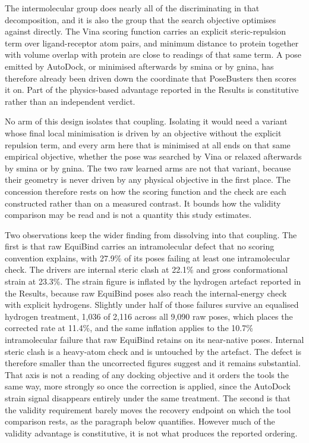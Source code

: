 The intermolecular group does nearly all of the discriminating in that decomposition, and it is also the group that the search objective optimises against directly. The Vina scoring function carries an explicit steric-repulsion term over ligand-receptor atom pairs, and minimum distance to protein together with volume overlap with protein are close to readings of that same term. A pose emitted by AutoDock, or minimised afterwards by smina or by gnina, has therefore already been driven down the coordinate that PoseBusters then scores it on. Part of the physics-based advantage reported in the Results is constitutive rather than an independent verdict.

No arm of this design isolates that coupling. Isolating it would need a variant whose final local minimisation is driven by an objective without the explicit repulsion term, and every arm here that is minimised at all ends on that same empirical objective, whether the pose was searched by Vina or relaxed afterwards by smina or by gnina. The two raw learned arms are not that variant, because their geometry is never driven by any physical objective in the first place. The concession therefore rests on how the scoring function and the check are each constructed rather than on a measured contrast. It bounds how the validity comparison may be read and is not a quantity this study estimates.

Two observations keep the wider finding from dissolving into that coupling. The first is that raw EquiBind carries an intramolecular defect that no scoring convention explains, with 27.9\% of its poses failing at least one intramolecular check. The drivers are internal steric clash at 22.1\% and gross conformational strain at 23.3\%. The strain figure is inflated by the hydrogen artefact reported in the Results, because raw EquiBind poses also reach the internal-energy check with explicit hydrogens. Slightly under half of those failures survive an equalised hydrogen treatment, 1,036 of 2,116 across all 9,090 raw poses, which places the corrected rate at 11.4\%, and the same inflation applies to the 10.7\% intramolecular failure that raw EquiBind retains on its near-native poses. Internal steric clash is a heavy-atom check and is untouched by the artefact. The defect is therefore smaller than the uncorrected figures suggest and it remains substantial. That axis is not a reading of any docking objective and it orders the tools the same way, more strongly so once the correction is applied, since the AutoDock strain signal disappears entirely under the same treatment. The second is that the validity requirement barely moves the recovery endpoint on which the tool comparison rests, as the paragraph below quantifies. However much of the validity advantage is constitutive, it is not what produces the reported ordering.

